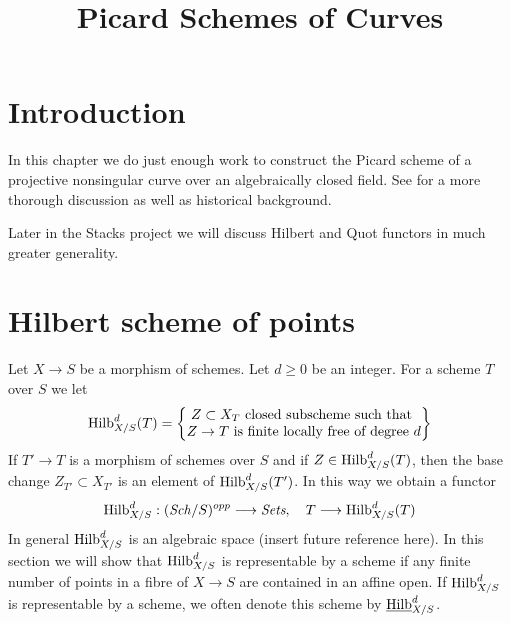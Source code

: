 

%


\title{Picard Schemes of Curves}


\maketitle

\label{section-phantom}

\tableofcontents


\section{Introduction}
\label{section-introduction}

\noindent
In this chapter we do just enough work to construct the Picard scheme
of a projective nonsingular curve over an algebraically closed field.
See \cite{Kleiman-Picard} for a more thorough discussion as well as
historical background.

\medskip\noindent
Later in the Stacks project we will discuss Hilbert and Quot functors
in much greater generality.


\section{Hilbert scheme of points}
\label{section-hilbert-scheme-points}

\noindent
Let $X \to S$ be a morphism of schemes. Let $d \geq 0$ be an integer.
For a scheme $T$ over $S$ we let
$$
\mathrm{Hilb}^d_{X/S}(T) =
\left\{
\begin{matrix}
Z \subset X_T\text{ closed subscheme such that }\\
Z \to T\text{ is finite locally free of degree }d
\end{matrix}
\right\}
$$
If $T' \to T$ is a morphism of schemes over $S$ and if
$Z \in \mathrm{Hilb}^d_{X/S}(T)$, then the base change
$Z_{T'} \subset X_{T'}$ is an element of $\mathrm{Hilb}^d_{X/S}(T')$.
In this way we obtain a functor
$$
\mathrm{Hilb}^d_{X/S} :
(\mathit{Sch}/S)^{opp} \longrightarrow \textit{Sets},\quad
T \longrightarrow \mathrm{Hilb}^d_{X/S}(T)
$$
In general $\mathrm{Hilb}^d_{X/S}$ is an algebraic space
(insert future reference here). In this section we will
show that $\mathrm{Hilb}^d_{X/S}$ is representable
by a scheme if any finite number of points in a fibre of
$X \to S$ are contained in an affine open.
If $\mathrm{Hilb}^d_{X/S}$ is representable by a scheme, we often
denote this scheme by $\underline{\mathrm{Hilb}}^d_{X/S}$.

